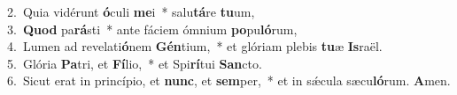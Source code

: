 {2.~}Quia vidérunt \textbf{ó}culi \textbf{me}i~* salu\textbf{tá}re \textbf{tu}um,\\
{3.~}\textbf{Quod} pa\textbf{rá}sti~* ante fáciem ómnium \textbf{po}pu\textbf{ló}rum,\\
{4.~}Lumen ad revelati\textbf{ó}nem \textbf{Gén}tium,~* et glóriam plebis \textbf{tu}æ \textbf{Is}raël.\\
{5.~}Glória \textbf{Pa}tri, et \textbf{Fí}lio,~* et Spi\textbf{rí}tui \textbf{San}cto.\\
{6.~}Sicut erat in princípio, et \textbf{nunc}, et \textbf{sem}per,~* et in sǽcula sæcu\textbf{ló}rum. \textbf{A}men.\\
